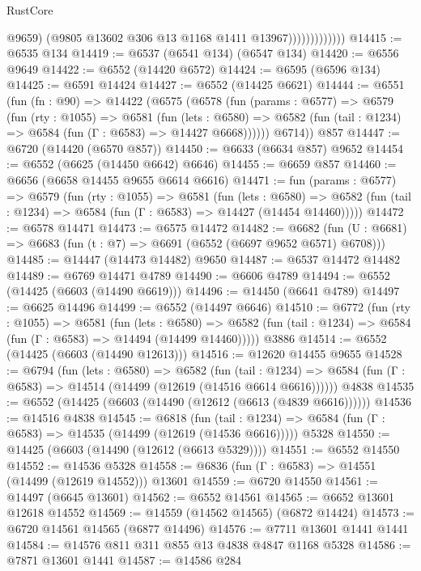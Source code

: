 \begin{lexlean}{RustCore}
\begin{coremodule}
                              @9659)
                            (@9805 @13602 @306 @13 @1168 @1411 @13967)))))))))))))
@14415 := @6535 @134
@14419 := @6537 (@6541 @134) (@6547 @134)
@14420 := @6556 @9649
@14422 := @6552 (@14420 @6572)
@14424 := @6595 (@6596 @134)
@14425 := @6591 @14424
@14427 := @6552 (@14425 @6621)
@14444 := @6551
    (fun (fn : @90) =>
    @14422
      (@6575
        (@6578
          (fun (params : @6577) =>
          @6579
            (fun (rty : @1055) =>
            @6581
              (fun (lets : @6580) =>
              @6582 (fun (tail : @1234) => @6584 (fun (Γ : @6583) => @14427 @6668))))))
        @6714))
    @857
@14447 := @6720 (@14420 (@6570 @857))
@14450 := @6633 (@6634 @857) @9652
@14454 := @6552 (@6625 (@14450 @6642) @6646)
@14455 := @6659 @857
@14460 := @6656 (@6658 @14455 @9655 @6614 @6616)
@14471 := fun (params : @6577) =>
  @6579
    (fun (rty : @1055) =>
    @6581
      (fun (lets : @6580) =>
      @6582 (fun (tail : @1234) => @6584 (fun (Γ : @6583) => @14427 (@14454 @14460)))))
@14472 := @6578 @14471
@14473 := @6575 @14472
@14482 := @6682 (fun (U : @6681) => @6683 (fun (t : @7) => @6691 (@6552 (@6697 @9652 @6571) @6708)))
@14485 := @14447 (@14473 @14482) @9650
@14487 := @6537 @14472 @14482
@14489 := @6769 @14471 @4789
@14490 := @6606 @4789
@14494 := @6552 (@14425 (@6603 (@14490 @6619)))
@14496 := @14450 (@6641 @4789)
@14497 := @6625 @14496
@14499 := @6552 (@14497 @6646)
@14510 := @6772
    (fun (rty : @1055) =>
    @6581
      (fun (lets : @6580) =>
      @6582 (fun (tail : @1234) => @6584 (fun (Γ : @6583) => @14494 (@14499 @14460)))))
    @3886
@14514 := @6552 (@14425 (@6603 (@14490 @12613)))
@14516 := @12620 @14455 @9655
@14528 := @6794
    (fun (lets : @6580) =>
    @6582
      (fun (tail : @1234) =>
      @6584 (fun (Γ : @6583) => @14514 (@14499 (@12619 (@14516 @6614 @6616))))))
    @4838
@14535 := @6552 (@14425 (@6603 (@14490 (@12612 (@6613 (@4839 @6616))))))
@14536 := @14516 @4838
@14545 := @6818
    (fun (tail : @1234) => @6584 (fun (Γ : @6583) => @14535 (@14499 (@12619 (@14536 @6616)))))
    @5328
@14550 := @14425 (@6603 (@14490 (@12612 (@6613 @5329))))
@14551 := @6552 @14550
@14552 := @14536 @5328
@14558 := @6836 (fun (Γ : @6583) => @14551 (@14499 (@12619 @14552))) @13601
@14559 := @6720 @14550
@14561 := @14497 (@6645 @13601)
@14562 := @6552 @14561
@14565 := @6652 @13601 @12618 @14552
@14569 := @14559 (@14562 @14565) (@6872 @14424)
@14573 := @6720 @14561 @14565 (@6877 @14496)
@14576 := @7711 @13601 @1441 @1441
@14584 := @14576 @811 @311 @855 @13 @4838 @4847 @1168 @5328
@14586 := @7871 @13601 @1441
@14587 := @14586 @284

\end{coremodule}
\end{lexlean}
